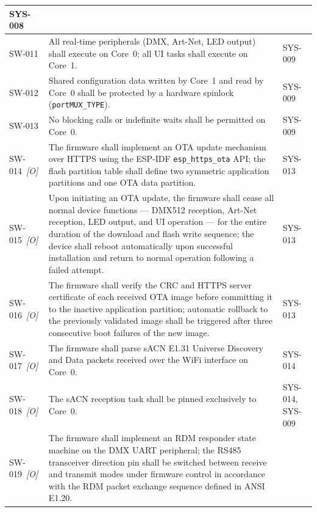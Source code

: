 \begin{longtable}{|p{1.8cm}|p{\dimexpr\linewidth-5.8cm-6\tabcolsep-4\arrayrulewidth\relax}|p{4cm}|}
      SYS-008 \\ \hline
    \label{req:sw011}SW-011 &
      All real-time peripherals (\ac{DMX}, Art-Net, \ac{LED} output) shall execute on Core~0; all \ac{UI} tasks shall execute on Core~1. &
      SYS-009 \\ \hline
    \label{req:sw012}SW-012 &
      Shared configuration data written by Core~1 and read by Core~0 shall be protected by a hardware spinlock (\texttt{portMUX\_TYPE}). &
      SYS-009 \\ \hline
    \label{req:sw013}SW-013 &
      No blocking calls or indefinite waits shall be permitted on Core~0. &
      SYS-009 \\ \hline
    \label{req:sw014}SW-014~\textit{[O]} &
      The firmware shall implement an \ac{OTA} update mechanism over \ac{HTTPS} using the ESP-IDF \texttt{esp\_https\_ota} \ac{API}; the flash partition table shall define two symmetric application partitions and one \ac{OTA} data partition. &
      SYS-013 \\ \hline
    \label{req:sw015}SW-015~\textit{[O]} &
      Upon initiating an \ac{OTA} update, the firmware shall cease all normal device functions — \ac{DMX}512 reception, Art-Net reception, \ac{LED} output, and \ac{UI} operation — for the entire duration of the download and flash write sequence; the device shall reboot automatically upon successful installation and return to normal operation following a failed attempt. &
      SYS-013 \\ \hline
    \label{req:sw016}SW-016~\textit{[O]} &
      The firmware shall verify the \ac{CRC} and \ac{HTTPS} server certificate of each received \ac{OTA} image before committing it to the inactive application partition; automatic rollback to the previously validated image shall be triggered after three consecutive boot failures of the new image. &
      SYS-013 \\ \hline
    \label{req:sw017}SW-017~\textit{[O]} &
      The firmware shall parse \ac{sACN} E1.31 Universe Discovery and Data packets received over the \ac{WiFi} interface on Core~0. &
      SYS-014 \\ \hline
    \label{req:sw018}SW-018~\textit{[O]} &
      The \ac{sACN} reception task shall be pinned exclusively to Core~0. &
      SYS-014, SYS-009 \\ \hline
    \label{req:sw019}SW-019~\textit{[O]} &
      The firmware shall implement an \ac{RDM} responder state machine on the \ac{DMX} \ac{UART} peripheral; the \ac{RS485} transceiver direction pin shall be switched between receive and transmit modes under firmware control in accordance with the \ac{RDM} packet exchange sequence defined in ANSI E1.20. &

\end{longtable}
